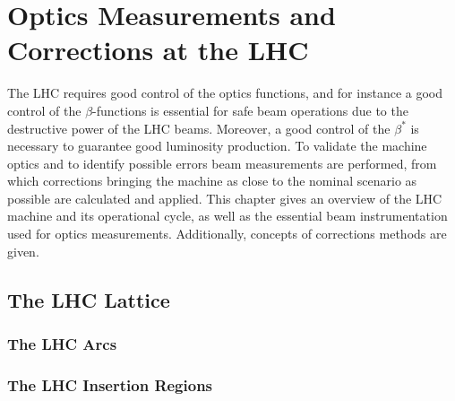 
\chapter{Optics Measurements and Corrections at the LHC} %

\label{Chapter2} %


The LHC requires good control of the optics functions, and for instance a good control of the \(\beta\)-functions is essential for safe beam operations due to the destructive power of the LHC beams.
Moreover, a good control of the \(\beta^{\ast}\) is necessary to guarantee good luminosity production.
To validate the machine optics and to identify possible errors beam measurements are performed, from which corrections bringing the machine as close to the nominal scenario as possible are calculated and applied. 
This chapter gives an overview of the LHC machine and its operational cycle, as well as the essential beam instrumentation used for optics measurements.
Additionally, concepts of corrections methods are given.




\section{The LHC Lattice}


\subsection{The LHC Arcs}

\subsection{The LHC Insertion Regions}

